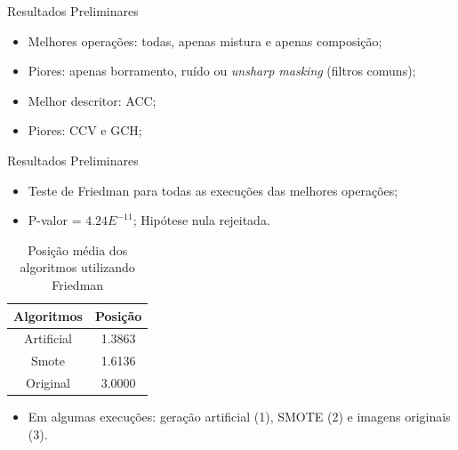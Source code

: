 \documentclass{beamer}
\begin{document}
\begin{frame}{Resultados Preliminares}
\setlength\leftmargini{0em}
\justifying
\begin{itemize}
\item Melhores operações: todas, apenas mistura e apenas composição;
\item Piores: apenas borramento, ruído ou \textit{unsharp masking} (filtros comuns);
\vspace{2pt}
\item Melhor descritor: ACC;
\item Piores: CCV e GCH;
\end{itemize}
\end{frame}
\begin{frame}{Resultados Preliminares}
\setlength\leftmargini{0em}
\justifying
\begin{itemize}
\item Teste de Friedman para todas as execuções das melhores operações;
\item P-valor = $4.24E^{-11}$; Hipótese nula rejeitada.
\end{itemize}
\begin{table}[htb]
\centering
\caption{Posição média dos algoritmos utilizando Friedman}
  \begin{tabular}{c|c}
    Algoritmos  &   Posição \\ \hline
    Artificial  &   1.3863  \\
    Smote       &   1.6136  \\
    Original    &   3.0000  \\
  \end{tabular}
\end{table}
\begin{itemize}
\item Em algumas execuções: geração artificial (1), SMOTE (2) e imagens originais (3).
\end{itemize}
\end{frame}
\end{document}
